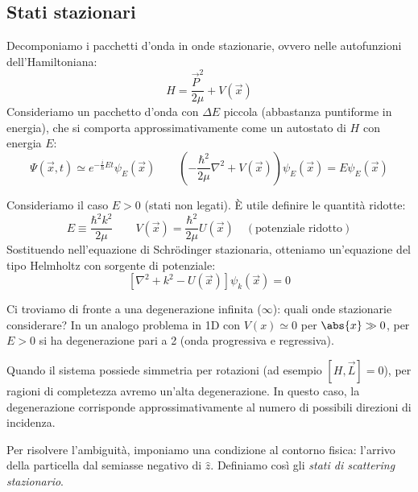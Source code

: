 \subsection{Stati stazionari}

Decomponiamo i pacchetti d'onda in onde stazionarie, ovvero nelle autofunzioni dell'Hamiltoniana:
\[
    H = \frac{\vec{P}^2}{2\mu} + V(\vec{x})
\]
Consideriamo un pacchetto d'onda con \( \Delta E \) piccola (abbastanza puntiforme in energia), che si comporta approssimativamente come un autostato di \( H \) con energia \( E \):
\begin{equation}
    \Psi(\vec{x},t) \simeq e^{-\frac{i}{\hbar}Et} \psi_E(\vec{x}) \qquad \left( -\frac{\hbar^2}{2\mu}\nabla^2 + V(\vec{x}) \right)\psi_E(\vec{x}) = E \psi_E(\vec{x})
\end{equation}

Consideriamo il caso \( E > 0 \) (stati non legati). È utile definire le quantità ridotte:
\[
    E \equiv \frac{\hbar^2 k^2}{2\mu} \qquad V(\vec{x}) = \frac{\hbar^2}{2\mu}U(\vec{x}) \quad (\text{potenziale ridotto})
\]
Sostituendo nell'equazione di Schrödinger stazionaria, otteniamo un'equazione del tipo Helmholtz con sorgente di potenziale:
\begin{equation}
    \left[ \nabla^2 + k^2 - U(\vec{x}) \right] \psi_k(\vec{x}) = 0
\end{equation}

\begin{remark}
    Ci troviamo di fronte a una degenerazione infinita (\( \infty \)): quali onde stazionarie considerare?
    In un analogo problema in 1D con \( V(x) \simeq 0 \) per \( \abs{x} \gg 0 \), per \( E > 0 \) si ha degenerazione pari a 2 (onda progressiva e regressiva).
\end{remark}

\begin{remark}
    Quando il sistema possiede simmetria per rotazioni (ad esempio \( [H, \vec{L}] = 0 \)), per ragioni di completezza avremo un'alta degenerazione.
    In questo caso, la degenerazione corrisponde approssimativamente al numero di possibili direzioni di incidenza.
\end{remark}

Per risolvere l'ambiguità, imponiamo una condizione al contorno fisica: l'arrivo della particella dal semiasse negativo di \( \hat{z} \). Definiamo così gli \textit{stati di scattering stazionario}.



